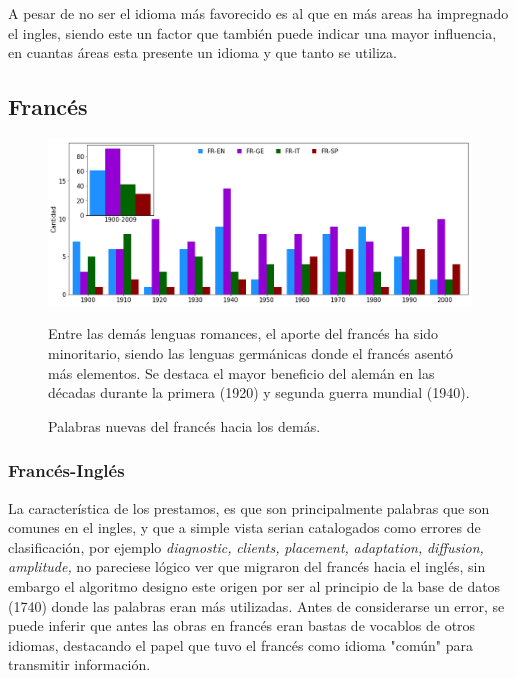 A pesar de no ser el idioma más favorecido es al que en más areas ha impregnado
el ingles, siendo este un factor que también puede indicar una mayor
influencia,  en cuantas áreas esta presente un idioma y que tanto se utiliza. 

\subsection{Francés} %

\begin{figure}[h!]
	\centering
	\includegraphics[scale=.38]{Cap_3/NC_FR.png}
	\label{fig.NC_FR}
	\caption{Palabras nuevas del francés hacia los demás.}
	\smallskip
	\small
	Entre las demás lenguas romances, el aporte del francés ha sido minoritario, siendo las lenguas germánicas donde el francés asentó más elementos. Se destaca el mayor beneficio del alemán en las décadas durante la primera (1920) y segunda guerra mundial (1940).
	
	
\end{figure}

\subsubsection*{Francés-Inglés}%

La característica de los prestamos, es que son principalmente palabras que son comunes en el ingles, y que a simple vista serian catalogados como errores de clasificación, por ejemplo  \textit{diagnostic,} \textit{clients,} \textit{placement,} \textit{adaptation,} \textit{diffusion,} \textit{amplitude,} no pareciese lógico ver que migraron del francés hacia el inglés, sin embargo el algoritmo designo este origen por ser al principio de la base de datos (1740)  donde las palabras eran más utilizadas.  Antes de considerarse un error, se puede inferir que antes las obras en francés eran bastas de vocablos de otros idiomas, destacando el papel que tuvo el francés como idioma "común" para transmitir información. 


